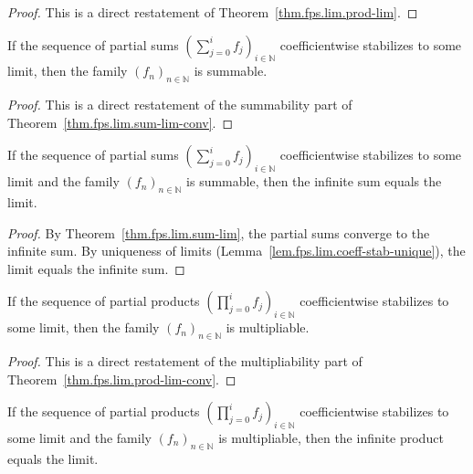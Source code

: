 \begin{proof}
\leanok
This is a direct restatement of Theorem~\ref{thm.fps.lim.prod-lim}.
\end{proof}

\begin{lemma}
\label{lem.fps.lim.summable-of-partial-sum-detail}
\leanhelper
\leanok
If the sequence of partial sums
$\left(\sum_{j=0}^{i} f_j\right)_{i\in\mathbb{N}}$ coefficientwise
stabilizes to some limit, then the family $(f_n)_{n\in\mathbb{N}}$ is
summable.
\end{lemma}

\begin{proof}
\leanok
This is a direct restatement of the summability part of
Theorem~\ref{thm.fps.lim.sum-lim-conv}.
\end{proof}

\begin{lemma}
\label{lem.fps.lim.tsum-eq-detail}
\leanhelper
\leanok
If the sequence of partial sums
$\left(\sum_{j=0}^{i} f_j\right)_{i\in\mathbb{N}}$ coefficientwise
stabilizes to some limit and the family $(f_n)_{n\in\mathbb{N}}$ is
summable, then the infinite sum equals the limit.
\end{lemma}

\begin{proof}
\leanok
By Theorem~\ref{thm.fps.lim.sum-lim}, the partial sums converge to the
infinite sum. By uniqueness of limits
(Lemma~\ref{lem.fps.lim.coeff-stab-unique}), the limit equals the
infinite sum.
\end{proof}

\begin{lemma}
\label{lem.fps.lim.multipliable-of-partial-prod-detail}
\leanhelper
\leanok
If the sequence of partial products
$\left(\prod_{j=0}^{i} f_j\right)_{i\in\mathbb{N}}$ coefficientwise
stabilizes to some limit, then the
family $(f_n)_{n\in\mathbb{N}}$ is multipliable.
\end{lemma}

\begin{proof}
\leanok
This is a direct restatement of the multipliability part of
Theorem~\ref{thm.fps.lim.prod-lim-conv}.
\end{proof}

\begin{lemma}
\label{lem.fps.lim.tprod-eq-detail}
\leanhelper
\leanok
If the sequence of partial products
$\left(\prod_{j=0}^{i} f_j\right)_{i\in\mathbb{N}}$ coefficientwise
stabilizes to some limit and the family $(f_n)_{n\in\mathbb{N}}$ is
multipliable, then the infinite product equals the limit.
\end{lemma}

